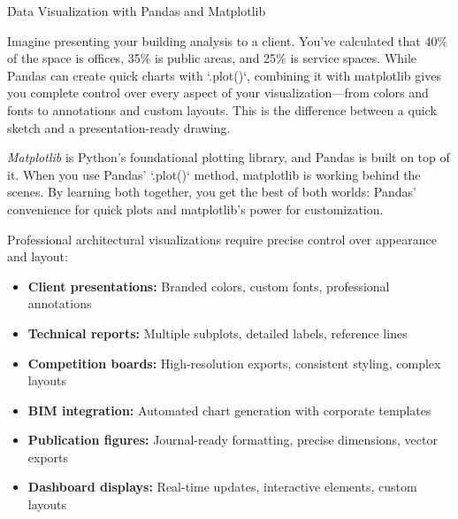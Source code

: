 
\h{Data Visualization with Pandas and Matplotlib}

Imagine presenting your building analysis to a client. You've calculated that 40\% of the space is offices, 35\% is public areas, and 25\% is service spaces. While Pandas can create quick charts with `.plot()`, combining it with matplotlib gives you complete control over every aspect of your visualization---from colors and fonts to annotations and custom layouts. This is the difference between a quick sketch and a presentation-ready drawing.

\emph{Matplotlib} is Python's foundational plotting library, and Pandas is built on top of it. When you use Pandas' `.plot()` method, matplotlib is working behind the scenes. By learning both together, you get the best of both worlds: Pandas' convenience for quick plots and matplotlib's power for customization.


Professional architectural visualizations require precise control over appearance and layout:

\begin{itemize}
\item \textbf{Client presentations:} Branded colors, custom fonts, professional annotations
\item \textbf{Technical reports:} Multiple subplots, detailed labels, reference lines
\item \textbf{Competition boards:} High-resolution exports, consistent styling, complex layouts
\item \textbf{BIM integration:} Automated chart generation with corporate templates
\item \textbf{Publication figures:} Journal-ready formatting, precise dimensions, vector exports
\item \textbf{Dashboard displays:} Real-time updates, interactive elements, custom layouts
\end{itemize}

